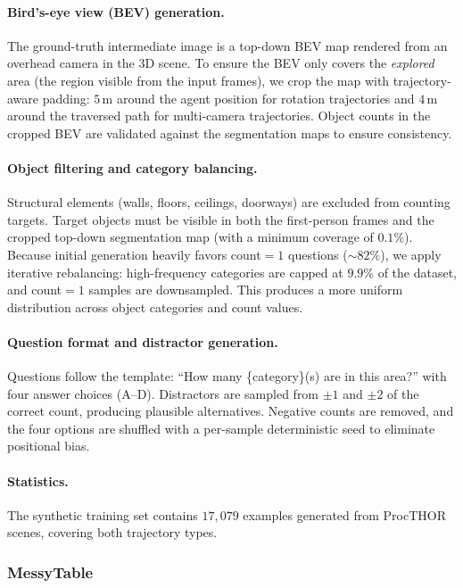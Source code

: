 \paragraph{Bird's-eye view (BEV) generation.}
The ground-truth intermediate image is a top-down BEV map rendered from an overhead camera in the 3D scene.
To ensure the BEV only covers the \emph{explored} area (the region visible from the input frames), we crop the map with trajectory-aware padding: $5$\,m around the agent position for rotation trajectories and $4$\,m around the traversed path for multi-camera trajectories.
Object counts in the cropped BEV are validated against the segmentation maps to ensure consistency.

\paragraph{Object filtering and category balancing.}
Structural elements (walls, floors, ceilings, doorways) are excluded from counting targets.
Target objects must be visible in both the first-person frames and the cropped top-down segmentation map (with a minimum coverage of $0.1\%$).
Because initial generation heavily favors count$=1$ questions (${\sim}82\%$), we apply iterative rebalancing: high-frequency categories are capped at $9.9\%$ of the dataset, and count$=1$ samples are downsampled.
This produces a more uniform distribution across object categories and count values.

\paragraph{Question format and distractor generation.}
Questions follow the template: ``How many \{category\}(s) are in this area?'' with four answer choices (A--D).
Distractors are sampled from $\pm1$ and $\pm2$ of the correct count, producing plausible alternatives.
Negative counts are removed, and the four options are shuffled with a per-sample deterministic seed to eliminate positional bias.

\paragraph{Statistics.}
The synthetic training set contains $17{,}079$ examples generated from ProcTHOR~\cite{deitke2022procthor} scenes, covering both trajectory types.

\subsubsection{MessyTable}

